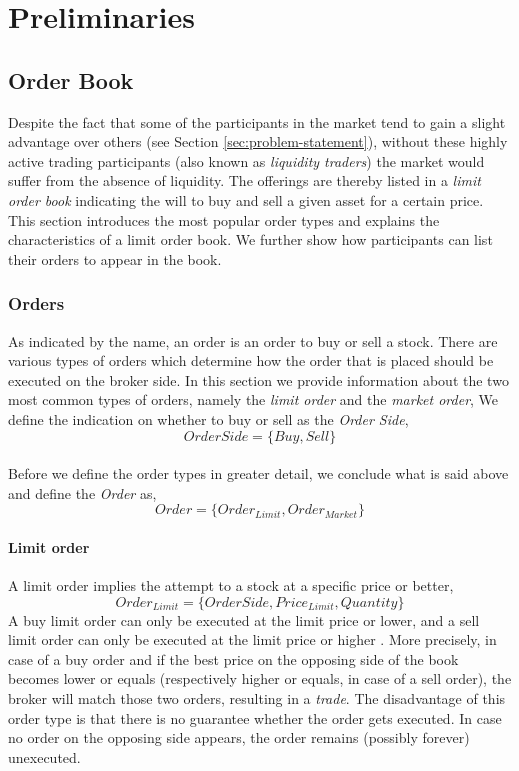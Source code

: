 \chapter{Preliminaries}
\label{chap:preliminaries}

\section{Order Book}

Despite the fact that some of the participants in the market tend to gain a slight advantage over others (see Section \ref{sec:problem-statement}), without these highly active trading participants (also known as \textit{liquidity traders}) the market would suffer from the absence of liquidity.
The offerings are thereby listed in a \textit{limit order book} indicating the will to buy and sell a given asset for a certain price.
This section introduces the most popular order types and explains the characteristics of a limit order book.
We further show how participants can list their orders to appear in the book.

\subsection{Orders}
\label{sec:orders}

As indicated by the name, an order is an order to buy or sell a stock.
There are various types of orders which determine how the order that is placed should be executed on the broker side.
In this section we provide information about the two most common types of orders, namely the \textit{limit order} and the \textit{market order},
We define the indication on whether to buy or sell as the \textit{Order Side},
\[OrderSide=\{Buy, Sell\}\]
\\
Before we define the order types in greater detail, we conclude what is said above and define the \textit{Order} as,
\[Order=\{Order_{Limit}, Order_{Market}\}\]

\subsubsection{Limit order}
\label{sec:limit-order}

A limit order implies the attempt to a stock at a specific price or better,
\[Order_{Limit}=\{OrderSide, Price_{Limit}, Quantity\}\]
A buy limit order can only be executed at the limit price or lower, and a sell limit order can only be executed at the limit price or higher \cite{sec-limit-order}.
More precisely, in case of a buy order and if the best price on the opposing side of the book becomes lower or equals (respectively higher or equals, in case of a sell order), the broker will match those two orders, resulting in a \textit{trade}.
The disadvantage of this order type is that there is no guarantee whether the order gets executed.
In case no order on the opposing side appears, the order remains (possibly forever) unexecuted.

